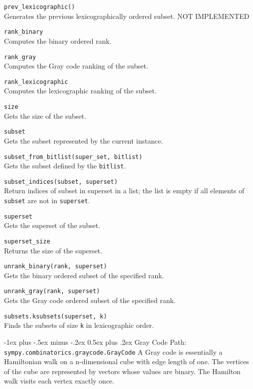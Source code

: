 \documentclass[10pt,landscape]{article}
\makeatletter
\renewcommand{\section}{\@startsection{section}{1}{0mm}%
                                {-1ex plus -.5ex minus -.2ex}%
                                {0.5ex plus .2ex}%
                                {\normalfont\large\bfseries}}
\makeatother
\begin{document}
\begin{multicols}{3}
\verb!prev_lexicographic()!\\
Generates the previous lexicographically ordered subset. NOT IMPLEMENTED

\verb!rank_binary!\\
Computes the binary ordered rank.



\verb!rank_gray!\\
Computes the Gray code ranking of the subset.


\verb!rank_lexicographic!\\
Computes the lexicographic ranking of the subset.



\verb!size!\\
Gets the size of the subset.



\verb!subset!\\
Gets the subset represented by the current instance.


\verb!subset_from_bitlist(super_set, bitlist)!\\
Gets the subset defined by the \verb!bitlist!.



\verb!subset_indices(subset, superset)!\\
Return indices of subset in superset in a list;
the list is empty if all elements of \verb!subset! are not in \verb!superset!.


\verb!superset!\\
Gets the superset of the subset.


\verb!superset_size!\\
Returns the size of the superset.


\verb!unrank_binary(rank, superset)!\\
Gets the binary ordered subset of the specified rank.



\verb!unrank_gray(rank, superset)!\\
Gets the Gray code ordered subset of the specified rank.



\verb!subsets.ksubsets(superset, k)!\\
Finds the subsets of size \verb!k! in lexicographic order.


\section{Gray Code}
Path: \verb!sympy.combinatorics.graycode.GrayCode!
A Gray code is essentially a Hamiltonian walk on a n-dimensional
 cube with edge length of one. The vertices of the cube are
 represented by vectors whose values are binary.
 The Hamilton walk visits each vertex exactly once.


\end{multicols}
\end{document}
